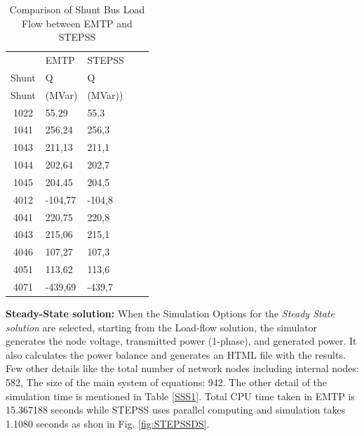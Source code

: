\documentclass{report}
\begin{document}
\begin{table}
\centering
\caption{Comparison of Shunt Bus Load Flow between EMTP and STEPSS}
\begin{tabular}{c|l l l l c|}    
 & \multicolumn{2}{l}{EMTP} & STEPSS \\
Shunt & \multicolumn{2}{l}{Q} & Q \\
Shunt & \multicolumn{2}{l}{(MVar)} & (MVar)) \\
\hline
1022 & \multicolumn{2}{l}{55.29} & 55,3 \\
1041 & \multicolumn{2}{l}{256,24} & 256,3 \\
1043 & \multicolumn{2}{l}{211,13} & 211,1 \\
1044 & \multicolumn{2}{l}{202,64} & 202,7 \\
1045 & \multicolumn{2}{l}{204,45} & 204,5 \\
4012 & \multicolumn{2}{l}{-104,77} & -104,8 \\
4041 & \multicolumn{2}{l}{220,75} & 220,8 \\
4043 & \multicolumn{2}{l}{215,06} & 215,1 \\
4046 & \multicolumn{2}{l}{107,27} & 107,3 \\
4051 & \multicolumn{2}{l}{113,62} & 113,6 \\
4071 & \multicolumn{2}{l}{-439,69} & -439,7 \\
\end{tabular}
\label{Shunt}
\end{table}

 \textbf{Steady-State solution: }
When the Simulation Options for the \textit{Steady State solution} are selected, starting from the Load-flow solution, the simulator generates the node voltage, transmitted power (1-phase), and generated power. It also calculates the power balance and generates an HTML file with the results. Few other details like the total number of network nodes including internal nodes: 582, The size of the main system of equations: 942. 
The other detail of the simulation time is mentioned in Table \ref{SSS1}. Total CPU time taken in EMTP is 15.367188 seconds while STEPSS uses parallel computing and simulation takes 1.1080 seconds as shon in Fig. \ref{fig:STEPSSDS}. 
\end{document}
